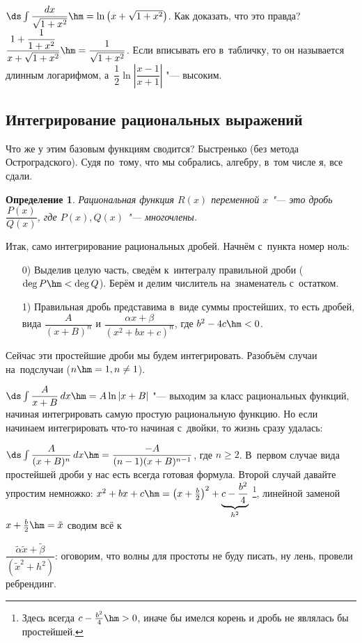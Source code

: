 \documentclass[a4paper,10pt,twoside]{article}
\newtheorem{Def}{Определение}[section]
\begin{document}
$\ds\int\dfrac{dx}{\sqrt{1+x^2}}\hm=\ln\big(x+\sqrt{1+x^2}\big)$. Как доказать, что это правда? $\dfrac{1+\dfrac1{1+x^2}}{x+\sqrt{1+x^2}}\hm=\dfrac1{\sqrt{1+x^2}}$.
Если вписывать его в~табличку, то он называется длинным логарифмом, а~$\dfrac12\ln\left|\dfrac{x-1}{x+1}\right|$ "--- высоким.

\subsection{Интегрирование рациональных выражений}
Что же у этим базовым функциям сводится? Быстренько (без метода Остроградского). Судя по~тому, что мы собрались, алгебру, в~том числе я, все сдали.

\begin{Def}
	Рациональная функция $R(x)$ переменной $x$ "--- это дробь $\dfrac{P(x)}{Q(x)}$, где $P(x),Q(x)$ "--- многочлены.
\end{Def}

Итак, само интегрирование рациональных дробей. Начнём с~пункта номер ноль:

\begin{itemize}
  \item[0)] Выделив целую часть, сведём к~интегралу правильной дроби ($\deg P\hm<\deg Q$). Берём и делим числитель на~знаменатель с~остатком.
  \item[1)] Правильная дробь представима в~виде суммы простейших, то есть дробей, вида 
  $\dfrac{A}{(x+B)^n}$ и $\dfrac{\alpha x+\beta}{(x^2+bx+c)^n}$, где $b^2-4c\hm<0$.
\end{itemize}

Сейчас эти простейшие дроби мы будем интегрировать. Разобъём случаи на~подслучаи ($n\hm=1, n\neq 1$).

$\ds\int\dfrac{A}{x+B}\,dx\hm=A\ln|x+B|$ "--- выходим за класс рациональных функций, начиная интегрировать самую простую рациональную функцию.
Но если начинаем интегрировать что-то начиная с~двойки, то жизнь сразу удалась:

$\ds\int\dfrac{A}{(x+B)^n}\,dx\hm=\dfrac{-A}{(n-1)(x+B)^{n-1}}$, где $n\geq2$. В~первом случае вида простейшей дроби у нас есть всегда готовая
формула. Второй случай давайте упростим немножко: $x^2+bx+c\hm=\left(x+\frac{b}2\right)^2+\underbrace{c-\frac{b^2}4}_{h^2}$
\footnote{Здесь всегда $c-\frac{b^2}4\hm>0$, иначе бы имелся корень и дробь не являлась бы простейшей.},
линейной заменой $x+\frac b2\hm=\tilde x$ сводим всё к

$\dfrac{\tilde \alpha\tilde x+\tilde \beta}{(\tilde x^2+h^2)}$: оговорим, что волны для простоты не буду писать, ну лень, провели ребрендинг.
\end{document}
